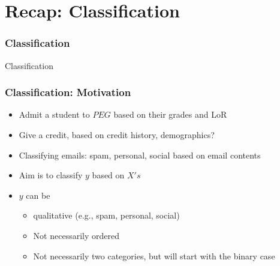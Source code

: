 \documentclass[
  shownotes,
  xcolor={svgnames},
  hyperref={colorlinks,citecolor=DarkBlue,linkcolor=DarkRed,urlcolor=DarkBlue}
  , aspectratio=169]{beamer}
\begin{document}
\section{Recap: Classification}
\begin{frame}[fragile]
\frametitle{Classification}


\centering
{\huge \textcolor{andesred}{Classification}}



\end{frame}
\begin{frame}[fragile]
\frametitle{Classification: Motivation}

\begin{itemize}
\item Admit a student to $PEG$ based on their grades and LoR
\medskip
\item Give a credit, based on credit history, demographics?
\medskip
\item Classifying emails: spam, personal, social based on email contents
\medskip
\item Aim is to classify $y$ based on $X's$
\medskip
\item $y$ can be
\begin{itemize}
  \item qualitative (e.g., spam, personal, social)
  \item Not necessarily ordered
  \item Not necessarily two categories, but will start with the binary case

\end{itemize}
\end{itemize}


\end{frame}
\end{document}
